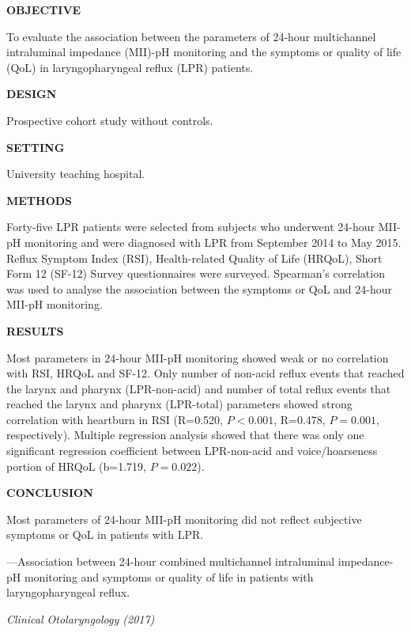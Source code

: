 \documentclass[a4paper]{ctexbook}
\begin{document}
\begin{sample}[label={myautocounter}]{\heiti}
  \textbf{OBJECTIVE} 
  
  To evaluate the association between the parameters of 24-hour multichannel intraluminal impedance (MII)-pH monitoring and the symptoms or quality of life (QoL) in laryngopharyngeal reflux (LPR) patients.

  \textbf{DESIGN} 
  
  Prospective cohort study without controls.

  \textbf{SETTING} 
  
  University teaching hospital.

  \textbf{METHODS} 
  
  Forty-five LPR patients were selected from subjects who underwent 24-hour MII-pH monitoring and were diagnosed with LPR from September 2014 to May 2015. Reflux Symptom Index (RSI), Health-related Quality of Life (HRQoL), Short Form 12 (SF-12) Survey questionnaires were surveyed. Spearman's correlation was used to analyse the association between the symptoms or QoL and 24-hour MII-pH monitoring.

  \textbf{RESULTS}

  Most parameters in 24-hour MII-pH monitoring showed weak or no correlation with RSI, HRQoL and SF-12. Only number of non-acid reflux events that reached the larynx and pharynx (LPR-non-acid) and number of total reflux events that reached the larynx and pharynx (LPR-total) parameters showed strong correlation with heartburn in RSI (R=0.520, $P<0.001$, R=0.478, $P=0.001$, respectively). Multiple regression analysis showed that there was only one significant regression coefficient between LPR-non-acid and voice/hoarseness portion of HRQoL (b=1.719, $P=0.022$).

  \textbf{CONCLUSION} 

  Most parameters of 24-hour MII-pH monitoring did not reflect subjective symptoms or QoL in patients with LPR.

  \begin{flushright}
    ---Association between 24-hour combined multichannel intraluminal impedance-pH monitoring and symptoms or quality of life in patients with laryngopharyngeal reflux. 
    
    \emph{Clinical Otolaryngology (2017)}
  \end{flushright}

  
\end{sample}
\end{document}
